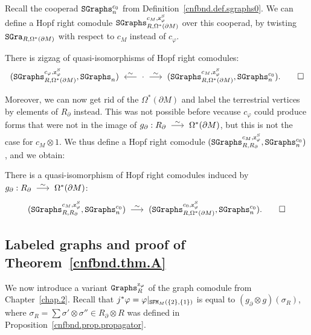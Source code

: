 Recall the cooperad $\mathtt{SGraphs}_{n}^{c_{0}}$ from Definition~\ref{cnfbnd.def.sgraphs0}.
We can define a Hopf right comodule $\mathtt{SGraphs}_{R, \Omega^{*}(\partial M)}^{c_{M}, \mathrm{z}^{S}_{\varphi}}$ over this cooperad, by twisting $\mathtt{SGra}_{R, \Omega^{*}(\partial M)}$ with respect to $c_{M}$ instead of $c_{\varphi}$.

\begin{corollary}
  There is zigzag of quasi-isomorphisms of Hopf right comodules:
  \[
    (\SGraphs_{R,\Omega^{*}(\partial M)}^{c_{\varphi},\szphi}, \SGraphs_{n}) \qiso* \cdot \qiso (\SGraphs_{R, \Omega^{*}(\partial M)}^{c_{M}, \szphi}, \SGraphs^{c_{0}}_{n}).
    \qed
  \]
\end{corollary}

Moreover, we can now get rid of the $\Omega^{*}(\partial M)$ and label the terrestrial vertices by elements of $R_{\partial}$ instead.
This was not possible before vecause $c_{\varphi}$ could produce forms that were not in the image of $g_{\partial} : R_{\partial} \qiso \Omega^{*}(\partial M)$, but this is not the case for $c_{M} \otimes 1$.
We thus define a Hopf right comodule $(\mathtt{SGraphs}_{R,R_{\partial}}^{c_{M}, \mathrm{z}^{S}_{\varphi}}, \mathtt{SGraphs}_{n}^{c_{0}})$, and we obtain:
\begin{lemma}
  There is a quasi-isomorphism of Hopf right comodules induced by $g_{\partial} : R_{\partial} \qiso \Omega^{*}(\partial M)$:
  \[ (\SGraphs_{R,R_{\partial}}^{c_{M}, \szphi}, \SGraphs_{n}^{c_{0}}) \qiso (\SGraphs_{R, \Omega^{*}(\partial M)}^{c_{0}, \szphi}, \SGraphs^{c_{0}}_{n}).
    \qed \]
\end{lemma}

\subsection{Labeled graphs and proof of Theorem~\ref{cnfbnd.thm.A}}
\label{cnfbnd.sec.labeled-graphs}

We now introduce a variant $\mathtt{Graphs}^{\mathrm{z}_{\varphi}}_{R}$ of the graph comodule from Chapter~\ref{chap.2}.
Recall that $j^{*} \varphi = \varphi|_{\mathtt{SFM}_{M}(\{2\},\{1\})}$ is equal to $(g_{\partial} \otimes g)(\sigma_{R})$, where $\sigma_{R} = \sum \sigma' \otimes \sigma'' \in R_{\partial} \otimes R$ was defined in Proposition~\ref{cnfbnd.prop.propagator}.

